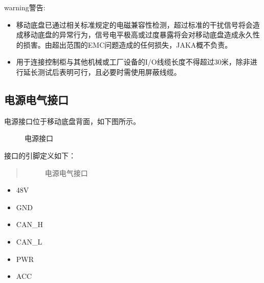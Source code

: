 \documentclass[a4paper,11pt,english,openany,oneside]{sphinxmanual}
\begin{document}
\begin{sphinxadmonition}{warning}{警告:}\begin{itemize}
\item {} 
\sphinxAtStartPar
移动底盘已通过相关标准规定的电磁兼容性检测，超过标准的干扰信号将会造成移动底盘的异常行为，信号电平极高或过度暴露将会对移动底盘造成永久性的损害。由超出范围的EMC问题造成的任何损失，JAKA概不负责。

\item {} 
\sphinxAtStartPar
用于连接控制柜与其他机械或工厂设备的I/O线缆长度不得超过30米，除非进行延长测试后表明可行，且必要时需使用屏蔽线缆。

\end{itemize}
\end{sphinxadmonition}


\subsection{电源电气接口}
\label{\detokenize{08 _u5b89_u88c5_u4e0e_u8c03_u8bd5:id15}}\label{\detokenize{08 _u5b89_u88c5_u4e0e_u8c03_u8bd5:id16}}
\sphinxAtStartPar
电源接口位于移动底盘背面，如下图所示。

\begin{figure}[H]
\centering
\capstart

\noindent{}
\caption{电源接口}\label{\detokenize{08 _u5b89_u88c5_u4e0e_u8c03_u8bd5:id49}}\end{figure}



\sphinxAtStartPar
接口的引脚定义如下：
\begin{quote}

\begin{figure}[H]
\centering
\capstart

\noindent{}
\caption{电源电气接口}\label{\detokenize{08 _u5b89_u88c5_u4e0e_u8c03_u8bd5:id50}}\end{figure}
\end{quote}
\begin{itemize}
\item {} 
 48V

\item {} 
 GND

\item {} 
 CAN\_H

\item {} 
 CAN\_L

\item {} 
 PWR

\item {} 
 ACC

\end{itemize}
\end{document}
